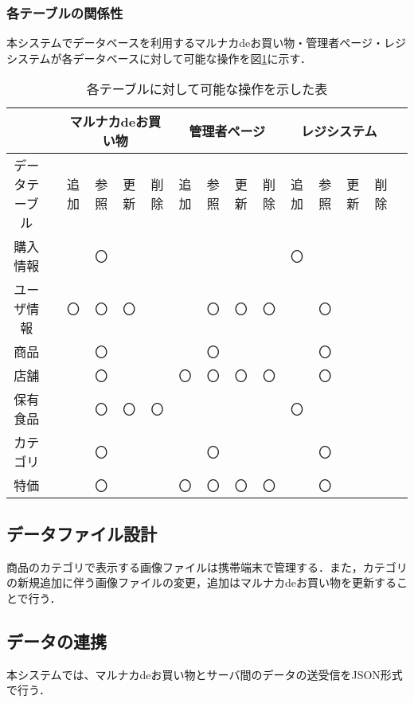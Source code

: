 \documentclass[a4j]{jarticle}
\begin{document}
\subsubsection{各テーブルの関係性}
本システムでデータベースを利用するマルナカdeお買い物・管理者ページ・レジシステムが各データベースに対して可能な操作を図\ref{tab:DB権限}に示す．
\begin{table}[H]
\caption{各テーブルに対して可能な操作を示した表}
\label{tab:DB権限}
\begin{center}
\begin{tabular}{|c|c|c|c|c|c|c|c|c|c|c|c|c|c|c|}%
\hline
&&\multicolumn{4}{|c|}{マルナカdeお買い物}&\multicolumn{4}{|c|}{管理者ページ}&\multicolumn{4}{|c|}{レジシステム}\\ \hline
データテーブル&&追加&参照&更新&削除&追加&参照&更新&削除&追加&参照&更新&削除\\ \hline\hline
購入情報	&&　&〇&	&	& 	&	&	&	&〇&&&\\ \hline
ユーザ情報	&&〇&〇&〇	&	&	&〇&〇&〇& &〇&&\\ \hline
商品		&&　&〇&	&	& 	&〇&	&	& &〇&&\\ \hline
店舗		&&　&〇&	&	&〇&〇&〇&〇& &〇&&\\ \hline
保有食品	&&　&〇&〇&〇& 	&	&	&	& 〇&&&\\ \hline
カテゴリ		&&　&〇&	&	&	&〇&	&	& &〇&&\\ \hline
特価		&&　&〇&	&	&〇&〇&〇&〇& &〇&&\\ \hline

\end{tabular}
\end{center}
\end{table}

\subsection{データファイル設計}
商品のカテゴリで表示する画像ファイルは携帯端末で管理する．また，カテゴリの新規追加に伴う画像ファイルの変更，追加はマルナカdeお買い物を更新することで行う．\\
\subsection{データの連携}
本システムでは、マルナカdeお買い物とサーバ間のデータの送受信をJSON形式で行う．
\end{document}
